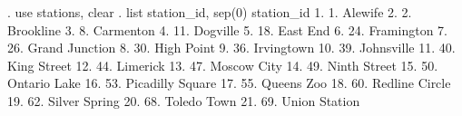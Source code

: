 . use stations, clear
{\smallskip}
. list station_id, sep(0)
{\smallskip}
     {\TLC}
     {\VBAR}           station_id {\VBAR}
     {\LFTT}
  1. {\VBAR}           1. Alewife {\VBAR}
  2. {\VBAR}         2. Brookline {\VBAR}
  3. {\VBAR}         8. Carmenton {\VBAR}
  4. {\VBAR}         11. Dogville {\VBAR}
  5. {\VBAR}         18. East End {\VBAR}
  6. {\VBAR}       24. Framington {\VBAR}
  7. {\VBAR}   26. Grand Junction {\VBAR}
  8. {\VBAR}       30. High Point {\VBAR}
  9. {\VBAR}       36. Irvingtown {\VBAR}
 10. {\VBAR}       39. Johnsville {\VBAR}
 11. {\VBAR}      40. King Street {\VBAR}
 12. {\VBAR}         44. Limerick {\VBAR}
 13. {\VBAR}      47. Moscow City {\VBAR}
 14. {\VBAR}     49. Ninth Street {\VBAR}
 15. {\VBAR}     50. Ontario Lake {\VBAR}
 16. {\VBAR} 53. Picadilly Square {\VBAR}
 17. {\VBAR}       55. Queens Zoo {\VBAR}
 18. {\VBAR}   60. Redline Circle {\VBAR}
 19. {\VBAR}    62. Silver Spring {\VBAR}
 20. {\VBAR}      68. Toledo Town {\VBAR}
 21. {\VBAR}    69. Union Station {\VBAR}
     {\BLC}
